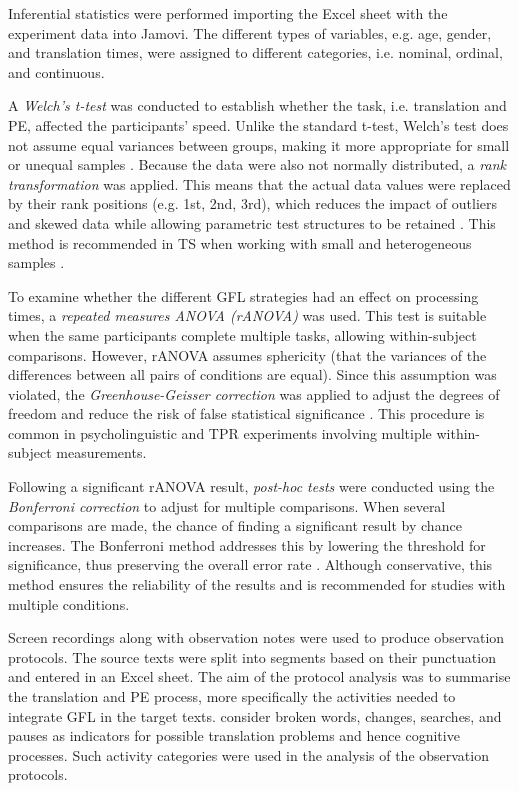 Inferential statistics were performed importing the Excel sheet with the experiment data into Jamovi. The different types of variables, e.g. age, gender, and translation times, were assigned to different categories, i.e. nominal, ordinal, and continuous. 

A \textit{Welch's t-test} was conducted to establish whether the task, i.e. translation and PE, affected the participants' speed. Unlike the standard t-test, Welch’s test does not assume equal variances between groups, making it more appropriate for small or unequal samples \citep{ruxton2006}. Because the data were also not normally distributed, a \textit{rank transformation} was applied. This means that the actual data values were replaced by their rank positions (e.g. 1st, 2nd, 3rd), which reduces the impact of outliers and skewed data while allowing parametric test structures to be retained \citep{zimmerman1993}. This method is recommended in TS when working with small and heterogeneous samples \citep{mellinger2016quantitative}.

To examine whether the different GFL strategies had an effect on processing times, a \textit{repeated measures ANOVA (rANOVA)} was used. This test is suitable when the same participants complete multiple tasks, allowing within-subject comparisons. However, rANOVA assumes sphericity (that the variances of the differences between all pairs of conditions are equal). Since this assumption was violated, the \textit{Greenhouse-Geisser correction} was applied to adjust the degrees of freedom and reduce the risk of false statistical significance \citep{girden1992}. This procedure is common in psycholinguistic and TPR experiments involving multiple within-subject measurements.

Following a significant rANOVA result, \textit{post-hoc tests} were conducted using the \textit{Bonferroni correction} to adjust for multiple comparisons. When several comparisons are made, the chance of finding a significant result by chance increases. The Bonferroni method addresses this by lowering the threshold for significance, thus preserving the overall error rate \citep{bland1995}. Although conservative, this method ensures the reliability of the results and is recommended for studies with multiple conditions.

Screen recordings along with observation notes were used to produce observation protocols. The source texts were split into segments based on their punctuation and entered in an Excel sheet. The aim of the protocol analysis was to summarise the translation and PE process, more specifically the activities needed to integrate GFL in the target texts. \textcite[536f]{munoz2019translating} consider broken words, changes, searches, and pauses as indicators for possible translation problems and hence cognitive processes. Such activity categories were used in the analysis of the observation protocols.

